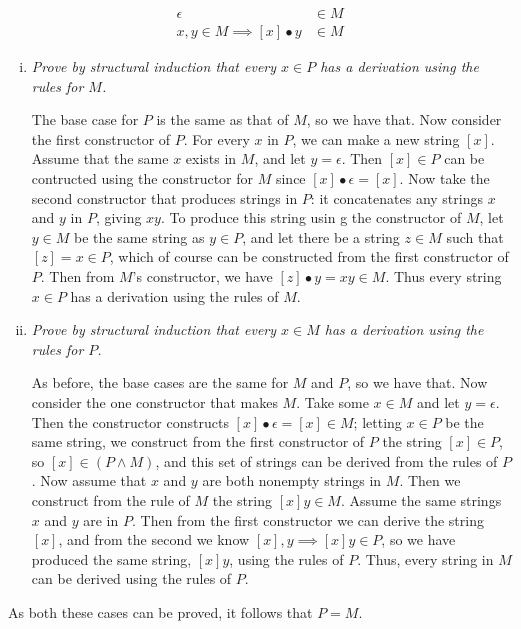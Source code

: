 \documentclass{article}
\begin{document}
\begin{enumerate}[(a)]
    \begin{align*}
      \epsilon &\in M \\
      x,y \in M \implies [x]\bullet y &\in M
    \end{align*}

  \begin{enumerate}[(i)]
    \item \textit{Prove by structural induction that every $x \in P$ has a derivation using the rules for $M$.}

      The base case for $P$ is the same as that of $M$, so we have that. Now consider the first constructor of $P$. For every $x$ in $P$, we can make a new string $[x]$. Assume that the same $x$ exists in $M$, and let $y = \epsilon$. Then $[x] \in P$ can be contructed using the constructor for $M$ since $[x] \bullet \epsilon = [x]$. Now take the second constructor that produces strings in $P$: it concatenates any strings $x$ and $y$ in $P$, giving $xy$. To produce this string usin g the constructor of $M$, let $y \in M$ be the same string as $y \in P$, and let there be a string $z \in M$ such that $[z] = x \in P$, which of course can be constructed from the first constructor of $P$. Then from $M$'s constructor, we have $[z]\bullet y = xy \in M$. Thus every string $x \in P$ has a derivation using the rules of $M$.
    \item \textit{Prove by structural induction that every $x \in M$ has a derivation using the rules for $P$.}

      As before, the base cases are the same for $M$ and $P$, so we have that. Now consider the one constructor that makes $M$. Take some $x \in M$ and let $y = \epsilon$. Then the constructor constructs $[x]\bullet \epsilon = [x] \in M$; letting $x \in P$ be the same string, we construct from the first constructor of $P$ the string $[x] \in P$, so $[x] \in (P \wedge M)$, and this set of strings can be derived from the rules of $P$. Now assume that $x$ and $y$ are both nonempty strings in $M$. Then we construct from the rule of $M$ the string $[x]y \in M$. Assume the same strings $x$ and $y$ are in $P$. Then from the first constructor we can derive the string $[x]$, and from the second we know $[x],y \implies [x]y \in P$, so we have produced the same string, $[x]y$, using the rules of $P$. Thus, every string in $M$ can be derived using the rules of $P$.
  \end{enumerate}

    As both these cases can be proved, it follows that $P = M$.
\end{enumerate}
\end{document}
